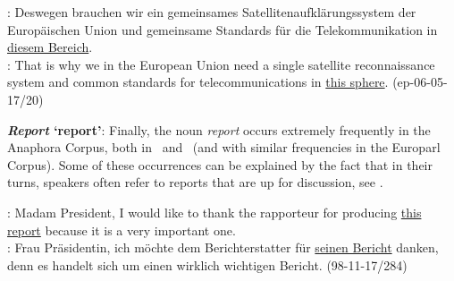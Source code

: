 \documentclass[output=paper]{LSP/langsci}
\begin{document}
\ea \label{ex:Bereich}
\DEo: Deswegen  brauchen wir  ein gemeinsames Satellitenaufkl\"arungssystem  der Europ\"aischen Union  und gemeinsame Standards  f\"ur die Telekommunikation  in  \ul{diesem Bereich}. \\
\ENt: That  is why  we  in  the European Union  need  a single satellite reconnaissance system and common standards  for  telecommunications  in \ul{this sphere}.  \hfill{(ep-06-05-17/20)}
\z


{\bfseries {\itshape Report} `report'}: Finally, the noun {\it report} occurs extremely frequently in the Anaphora Corpus, both in \ENo\ and \ENt\ (and with similar frequencies in the Europarl Corpus). Some of these occurrences can be explained by the fact that in their turns, speakers often refer to reports that are up for discussion, see .

\ea 
\label{ex:report}  %
\ENo: Madam President, I would like to thank the rapporteur for producing \ul{this report} because it is a very important one.\\
\DEt: Frau Pr\"asidentin, ich m\"ochte dem Berichterstatter f\"ur \ul{seinen Bericht} danken, denn es handelt sich um einen wirklich wichtigen Bericht. \hfill{(98-11-17/284)}
\z



\end{document}

